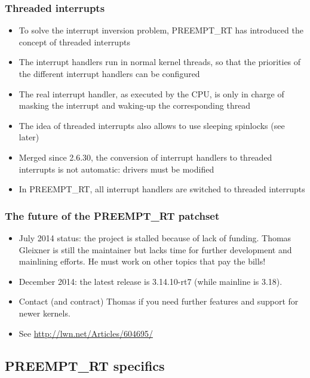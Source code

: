 \begin{frame}
  \frametitle{Threaded interrupts}
  \begin{itemize}
  \item To solve the interrupt inversion problem, PREEMPT\_RT has
    introduced the concept of threaded interrupts
  \item The interrupt handlers run in normal kernel threads, so that
    the priorities of the different interrupt handlers can be
    configured
  \item The real interrupt handler, as executed by the CPU, is only in
    charge of masking the interrupt and waking-up the corresponding
    thread
  \item The idea of threaded interrupts also allows to use sleeping
    spinlocks (see later)
  \item Merged since 2.6.30, the conversion of interrupt handlers to
    threaded interrupts is not automatic: drivers must be modified
  \item In PREEMPT\_RT, all interrupt handlers are switched to
    threaded interrupts
  \end{itemize}
\end{frame}

\begin{frame}
  \frametitle{The future of the PREEMPT\_RT patchset}
  \begin{itemize}
  \item July 2014 status: the project is stalled because of lack
	of funding. Thomas Gleixner is still the maintainer but
	lacks time for further development and mainlining efforts.
	He must work on other topics that pay the bills!
  \item December 2014: the latest release is 3.14.10-rt7 (while
	mainline is 3.18).
  \item Contact (and contract) Thomas if you need further
	features and support for newer kernels.
  \item See \url{http://lwn.net/Articles/604695/}
  \end{itemize}
\end{frame}

\subsection{PREEMPT\_RT specifics}


